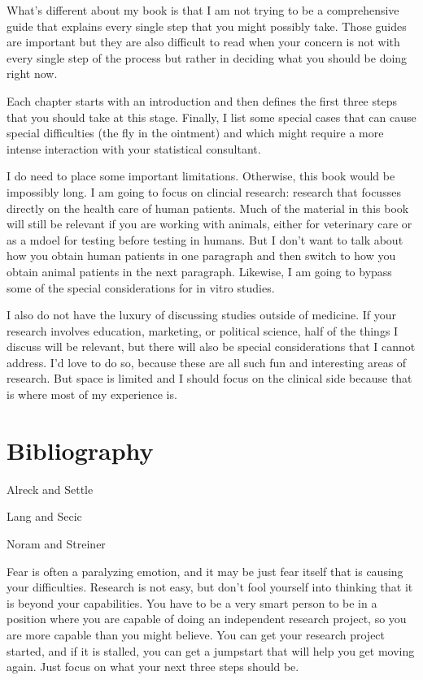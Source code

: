\documentclass[
  letterpaper,
  DIV=11,
  numbers=noendperiod]{scrreprt}
\begin{document}
What's different about my book is that I am not trying to be a
comprehensive guide that explains every single step that you might
possibly take. Those guides are important but they are also difficult to
read when your concern is not with every single step of the process but
rather in deciding what you should be doing right now.

Each chapter starts with an introduction and then defines the first
three steps that you should take at this stage. Finally, I list some
special cases that can cause special difficulties (the fly in the
ointment) and which might require a more intense interaction with your
statistical consultant.

I do need to place some important limitations. Otherwise, this book
would be impossibly long. I am going to focus on clincial research:
research that focusses directly on the health care of human patients.
Much of the material in this book will still be relevant if you are
working with animals, either for veterinary care or as a mdoel for
testing before testing in humans. But I don't want to talk about how you
obtain human patients in one paragraph and then switch to how you obtain
animal patients in the next paragraph. Likewise, I am going to bypass
some of the special considerations for in vitro studies.

I also do not have the luxury of discussing studies outside of medicine.
If your research involves education, marketing, or political science,
half of the things I discuss will be relevant, but there will also be
special considerations that I cannot address. I'd love to do so, because
these are all such fun and interesting areas of research. But space is
limited and I should focus on the clinical side because that is where
most of my experience is.

\section{Bibliography}\label{bibliography}

Alreck and Settle

Lang and Secic

Noram and Streiner

Fear is often a paralyzing emotion, and it may be just fear itself that
is causing your difficulties. Research is not easy, but don't fool
yourself into thinking that it is beyond your capabilities. You have to
be a very smart person to be in a position where you are capable of
doing an independent research project, so you are more capable than you
might believe. You can get your research project started, and if it is
stalled, you can get a jumpstart that will help you get moving again.
Just focus on what your next three steps should be.
\end{document}
